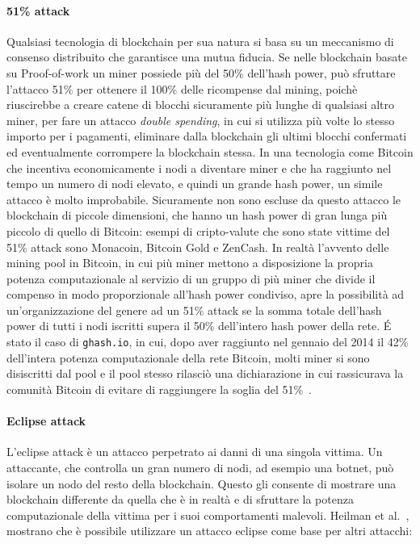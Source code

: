 \paragraph{51\% attack}
Qualsiasi tecnologia di blockchain per sua natura si basa su un meccanismo di consenso distribuito che garantisce una mutua fiducia. Se nelle blockchain basate su Proof-of-work un miner possiede più del 50\% dell'hash power,
può sfruttare l'attacco 51\% per ottenere il 100\% delle ricompense dal mining, poichè riuscirebbe a creare catene di blocchi sicuramente più lunghe di qualsiasi altro miner, per fare un attacco \emph{double spending}, in cui si utilizza più volte lo stesso importo per i pagamenti, eliminare dalla blockchain gli ultimi blocchi confermati ed eventualmente corrompere la blockchain stessa.
In una tecnologia come Bitcoin che incentiva economicamente i nodi a diventare miner e che ha raggiunto nel tempo un numero di nodi elevato, e quindi un grande hash power, un simile attacco è molto improbabile. Sicuramente non sono escluse da questo attacco le blockchain di piccole dimensioni, che hanno un hash power di gran lunga più piccolo di quello di Bitcoin: esempi di cripto-valute che sono state vittime del 51\% attack sono Monacoin, Bitcoin Gold e ZenCash. 
In realtà l'avvento delle mining pool in Bitcoin, in cui più miner mettono a disposizione la propria potenza computazionale al servizio di un gruppo di più miner che divide il compenso in modo proporzionale all'hash power condiviso, apre la possibilità ad un'organizzazione del genere ad un 51\% attack se la somma totale dell'hash power di tutti i nodi iscritti supera il 50\% dell'intero hash power della rete. \'E stato il caso di \texttt{ghash.io}, in cui, dopo aver raggiunto nel gennaio del 2014 il 42\% dell'intera potenza computazionale della rete Bitcoin, molti miner si sono disiscritti dal pool e il pool stesso rilasciò una dichiarazione in cui rassicurava la comunità Bitcoin di evitare di raggiungere la soglia del 51\%~\cite{51-attack}.

\paragraph{Eclipse attack}
L'eclipse attack è un attacco perpetrato ai danni di una singola vittima. Un attaccante, che controlla un gran numero di nodi, ad esempio una botnet, può isolare un nodo del resto della blockchain. Questo gli consente di mostrare una blockchain differente da quella che è in realtà e di sfruttare la potenza computazionale della vittima per i suoi comportamenti malevoli. Heilman et al.~\cite{heilman2015eclipse}, mostrano che è possibile utilizzare un attacco eclipse come base per altri attacchi:

